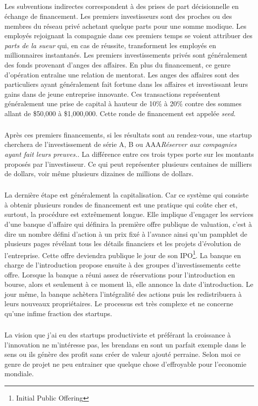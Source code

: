 \documentclass[11pt, a4paper ]{article}
\begin{document}
\begin{spacing}{1.5}
\subparagraph{}
Les subventions indirectes correspondent à des prises de part décisionnelle en échange de financement. Les premiers investisseurs sont des proches ou des membres du réseau privé achetant quelque parts pour une somme modique. Les employés rejoignant la compagnie dans ces premiers temps se voient attribuer des \emph{parts de la sueur} qui, en cas de réussite, transforment les employés en millionnaires instantanés.
Les premiers investissements privés sont généralement des fonds provenant d'anges des affaires. En plus du financement, ce genre d'opération entraîne une relation de mentorat. Les anges des affaires sont des particuliers ayant généralement fait fortune dans les affaires et investissant leurs gains dans de jeune entreprise innovante. Ces transactions représentent généralement une prise de capital à hauteur de 10\% à 20\% contre des sommes allant de \$50,000 à \$1,000,000. Cette ronde de financement est appelée \emph{seed}.

\subparagraph{}
Après ces premiers financements, si les résultats sont au rendez-vous, une startup cherchera de l'investissement de série A, B ou AAA\emph{Réserver aux compagnies ayant fait leurs preuves.}. La différence entre ces trois types porte sur les montants proposés par l'investisseur. Ce qui peut représenter plusieurs centaines de milliers de dollars, voir même plusieurs dizaines de millions de dollars.

\subparagraph{}
La dernière étape est généralement la capitalisation. Car ce système qui consiste à obtenir plusieurs rondes de financement est une pratique qui coûte cher et, surtout, la procédure est extrêmement longue. Elle implique d'engager les services d'une banque d'affaire qui définira la première offre publique de valuation, c'est à dire un nombre défini d'action à un prix fixé à l'avance ainsi qu'un pamphlet de plusieurs pages révélant tous les détails financiers et les projets d'évolution de l'entreprise. Cette offre deviendra publique le jour de son IPO\footnote{Initial Public Offering}. La banque en charge de l'introduction propose ensuite à des groupes d'investissements cette offre. Lorsque la banque a réuni assez de réservations pour l'introduction en bourse, alors et seulement à ce moment là, elle annonce la date d'introduction.  Le jour même, la banque achètera l'intégralité des actions puis les redistribuera à leurs nouveaux propriétaires.
Le processus est très complexe et ne concerne qu'une infime fraction des startups.

\subparagraph{}
La vision que j'ai eu des startups productiviste et préférant la croissance à l'innovation ne m'intéresse pas, les brendans en sont un parfait exemple dans le sens ou ils génère des profit sans créer de valeur ajouté perraine. Selon moi ce genre de projet ne peu entrainer que quelque chose d'effroyable pour l'economie mondiale.


\end{spacing}
\end{document}
